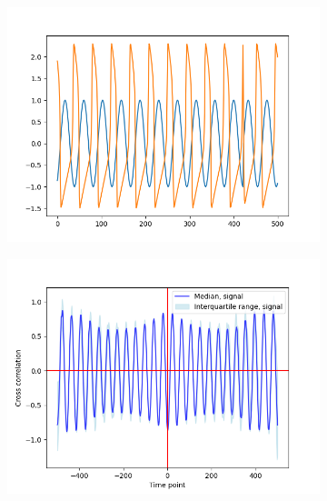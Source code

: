 \begin{figure}
  \centering
  \begin{subfigure}[t]{0.5\textwidth}
  \centering
    \includegraphics[width=\linewidth]{sinusoid_and_fitzhughnagumo_nonoise.png}
    \caption{
    }
    \label{fig:xcf-nonoise-ts}
  \end{subfigure}%
  \centering
  \begin{subfigure}[t]{0.5\textwidth}
  \centering
    \includegraphics[width=\linewidth]{randomshift_sinusoid_fitzhughnagumo_xcf.png}
    \caption{
    }
    \label{fig:xcf-nonoise-xcf}
  \end{subfigure}


\end{figure}
